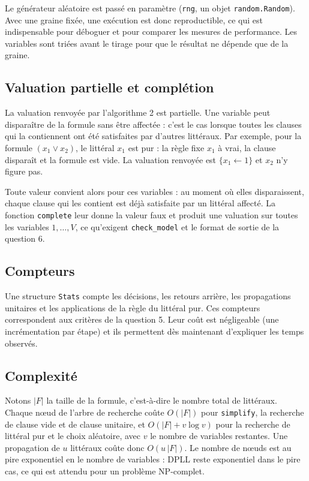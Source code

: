 \documentclass[11pt,a4paper]{article}
\begin{document}
Le générateur aléatoire est passé en paramètre (\texttt{rng}, un objet
\texttt{random.Random}). Avec une graine fixée, une exécution est donc
reproductible, ce qui est indispensable pour déboguer et pour comparer les
mesures de performance. Les variables sont triées avant le tirage pour que le
résultat ne dépende que de la graine.

\subsection{Valuation partielle et complétion}
\label{sec:valuation}

La valuation renvoyée par l'algorithme 2 est partielle. Une variable peut
disparaître de la formule sans être affectée : c'est le cas lorsque toutes les
clauses qui la contiennent ont été satisfaites par d'autres littéraux. Par
exemple, pour la formule $(x_1\lor x_2)$, le littéral $x_1$ est pur : la règle
fixe $x_1$ à vrai, la clause disparaît et la formule est vide. La valuation
renvoyée est $\{x_1\leftarrow 1\}$ et $x_2$ n'y figure pas.

Toute valeur convient alors pour ces variables : au moment où elles
disparaissent, chaque clause qui les contient est déjà satisfaite par un
littéral affecté. La fonction \texttt{complete} leur donne la valeur faux
et produit une valuation sur toutes les variables $1,\ldots,V$, ce qu'exigent
\texttt{check\_model} et le format de sortie de la question 6.

\subsection{Compteurs}

Une structure \texttt{Stats} compte les décisions, les retours arrière, les
propagations unitaires et les applications de la règle du littéral pur. Ces
compteurs correspondent aux critères de la question 5. Leur coût est
négligeable (une incrémentation par étape) et ils permettent dès maintenant
d'expliquer les temps observés.

\subsection{Complexité}

Notons $|F|$ la taille de la formule, c'est-à-dire le nombre total de
littéraux. Chaque n\oe{}ud de l'arbre de recherche coûte $O(|F|)$ pour
\texttt{simplify}, la recherche de clause vide et de clause unitaire, et
$O(|F| + v\log v)$ pour la recherche de littéral pur et le choix aléatoire,
avec $v$ le nombre de variables restantes. Une propagation de $u$ littéraux
coûte donc $O(u\,|F|)$. Le nombre de n\oe{}uds est au pire exponentiel en le
nombre de variables : DPLL reste exponentiel dans le pire cas, ce qui est
attendu pour un problème NP-complet.
\end{document}
